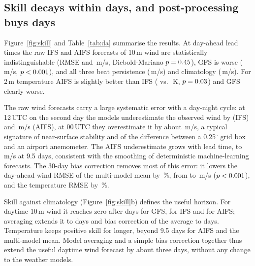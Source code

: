 \subsection{Skill decays within days, and post-processing buys days}



Figure~\ref{fig:skill} and Table~\ref{tab:da} summarise the results. At day-ahead lead times the raw IFS and AIFS forecasts of 10\,m wind are statistically indistinguishable (RMSE \valWindIfsRmseDayAhead{} and \valWindAifsRmseDayAhead\,m/s, Diebold-Mariano $p=0.45$), GFS is worse (\valWindGfsRmseDayAhead\,m/s, $p< 0.001$), and all three beat persistence (\valWindPersistenceRmseDayAhead\,m/s) and climatology (\valWindClimatologyRmseDayAhead\,m/s). For 2\,m temperature AIFS is slightly better than IFS (\valTempAifsRmseDayAhead{} vs.\ \valTempIfsRmseDayAhead\,K, $p=0.03$) and GFS clearly worse.

The raw wind forecasts carry a large systematic error with a day-night cycle: at 12\,UTC on the second day the models underestimate the observed wind by \valWindIfsBiasThirtySix{} (IFS) and \valWindAifsBiasThirtySix{}\,m/s (AIFS), at 00\,UTC they overestimate it by about \valWindIfsBiasTwentyFour\,m/s, a typical signature of near-surface stability and of the difference between a 0.25$^\circ$ grid box and an airport anemometer. The AIFS underestimate grows with lead time, to \valWindAifsBiasNineHalfDay\,m/s at 9.5 days, consistent with the smoothing of deterministic machine-learning forecasts. The 30-day bias correction removes most of this error: it lowers the day-ahead wind RMSE of the multi-model mean by \valWindBcGainPct\,\%, from \valWindMmmRmseDayAhead{} to \valWindMmmBcRmseDayAhead\,m/s ($p< 0.001$), and the temperature RMSE by \valTempBcGainPct\,\%.

Skill against climatology (Figure~\ref{fig:skill}b) defines the useful horizon. For daytime 10\,m wind it reaches zero after \valWindGfsSkillZeroDays{} days for GFS, \valWindIfsSkillZeroDays{} for IFS and \valWindAifsSkillZeroDays{} for AIFS; averaging extends it to \valWindMmmSkillZeroDays{} days and bias correction of the average to \valWindMmmBcSkillZeroDays{} days. Temperature keeps positive skill for longer, beyond 9.5 days for AIFS and the multi-model mean. Model averaging and a simple bias correction together thus extend the useful daytime wind forecast by about three days, without any change to the weather models.

